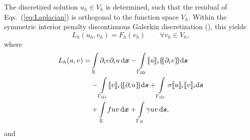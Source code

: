 The discretized solution $u_h\in V_h$ is determined, such that
  the residual of Eqs.~(\ref{eq:Laplacian}) is orthogonal to the function
  space $V_h$.  Within the symmetric interior penalty
  discontinuous Galerkin discretization (\cite{arnold.d;brezzi.f;cockburn.b;marini.l2002,di2011mathematical}), this yields
%  
\begin{equation}
  L_h(u_h,v_h) = F_h(v_h) \qquad  \forall v_h \in V_h,
\end{equation}
%
where
%
%
\begin{align} 
  \label{eq:lh}
 \nonumber
 L_h(u,v)
 =&
 \int\displaylimits_{\mathbb{E}}  \partial_i v\partial_i u \,\mathrm{d}\tv{x}
 - \int\displaylimits_{\Gamma_{\rm ID}} \llbracket u \rrbracket_i \dgal*{\partial_i v}\mathrm{d}\tv s \\ \nonumber
 &
 - \int\displaylimits_{\Gamma_{\rm ID}} \llbracket v \rrbracket_i \dgal*{\partial_i u} \mathrm{d}\tv s
+\int\displaylimits_{\Gamma_{\rm ID}}\sigma \llbracket u \rrbracket_i \llbracket v \rrbracket_i \mathrm{d}\tv s  \\
&
+ \int\displaylimits_{\mathbb{E}} f u v \,\mathrm{d}\tv{x} + \int\displaylimits_{\Gamma_R} \gamma u v \,\mathrm{d}\tv s ,
\end{align}
%
and

